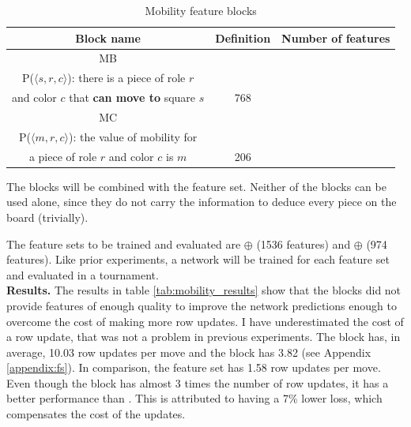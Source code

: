\begin{table}[H]
\caption{Mobility feature blocks}
\label{tab:mobility_blocks}
\centering

\begin{tabular}{ccc}
\toprule
\bf Block name & \bf Definition & \bf Number of features \\
\toprule
MB & \makecell{
\vspace{0.2cm}
($\featureset{Squares} \times \featureset{Roles} \times \featureset{Colors})_P$ \\
P($\langle s, r, c \rangle$): there is a piece of role $r$\\ and color $c$ that \textbf{can move to} square $s$
} & 768 \\
\toprule
MC & \makecell{
\vspace{0.2cm}
$(\{0, 1, \hdots\} \times \featureset{Roles} \times \featureset{Colors})_{P}$\\
P($\langle m, r, c \rangle$): the value of mobility for\\
a piece of role $r$ and color $c$ is $m$
} & 206 \\
\bottomrule
\end{tabular}
\end{table}

The blocks will be combined with the  feature set. Neither of the blocks can be used alone, since they do not carry the information to deduce every piece on the board (trivially).

The feature sets to be trained and evaluated are  $\oplus$  (1536 features) and  $\oplus$  (974 features). Like prior experiments, a network will be trained for each feature set and evaluated in a tournament. \\

\textbf{Results.} The results in table \ref{tab:mobility_results} show that the blocks did not provide features of enough quality to improve the network predictions enough to overcome the cost of making more row updates. I have underestimated the cost of a row update, that was not a problem in previous experiments. The block  has, in average, 10.03 row updates per move and the block  has 3.82 (see Appendix \ref{appendix:fs}). In comparison, the  feature set has 1.58 row updates per move. Even though the block  has almost 3 times the number of row updates, it has a better performance than . This is attributed to having a 7\% lower loss, which compensates the cost of the updates. \\

